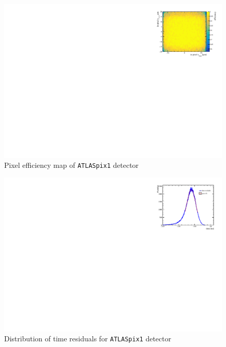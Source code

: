 \documentclass[twocolumn,DIV=14,a4paper,biblatex, 10pt]{scrartcl}
\newcommand{\atlaspix}{\texttt{ATLASpix1}\xspace}
\begin{document}
\begin{figure}
  \begin{center}
    \includegraphics{pixel_efficiency}
  \end{center}
  \caption{Pixel efficiency map of \atlaspix detector\label{fig:pixel_eff}}
\end{figure}

\begin{figure}
  \begin{center}
    \includegraphics{residuals_time}
  \end{center}
  \caption{Distribution of time residuals for \atlaspix detector\label{fig:time_res}}
\end{figure}
\end{document}
